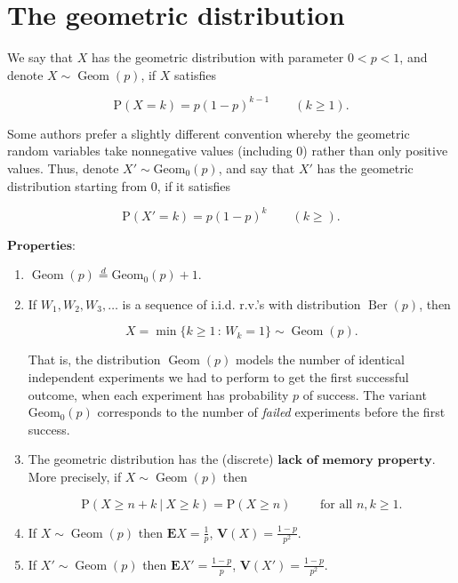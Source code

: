 \documentclass[11pt]{report}
\theoremstyle{plain}
\theoremstyle{definition}
\begin{document}
\section{The geometric distribution}
We say that $X$ has the geometric distribution with
parameter $0<p<1$, and denote
$X\sim \operatorname{Geom}(p)$, if $X$ satisfies

\[
\mathrm{P}(X=k) = p(1-p)^{k-1} \qquad (k \ge 1).
\]

Some authors prefer a slightly different convention
whereby the geometric random variables take
nonnegative values (including $0$) rather than only
positive values. Thus, denote
$X' \sim \operatorname{Geom_0}(p)$, and say that $X'$
has the geometric distribution starting from $0$, if
it satisfies

\[
\mathrm{P}(X'=k) = p(1-p)^{k} \qquad (k \ge ).
\]

$\textbf{Properties:}$

\begin{enumerate}[label=\arabic*.]
\item $\operatorname{Geom}(p) \stackrel{d}{=}
\operatorname{Geom_0}(p) + 1$.

\item If $W_1,W_2,W_3, \ldots$ is a sequence of i.i.d.
r.v.'s with distribution $\operatorname{Ber}(p)$,
then

\[
X = \min\{ k\ge 1\,:\, W_k = 1\}  \sim \operatorname{Geom}(p).
\]

That is, the distribution $\operatorname{Geom}(p)$
models the number of identical independent experiments
we had to perform to get the first successful outcome,
when each experiment has probability $p$ of success.
The variant $\operatorname{Geom_0}(p)$ corresponds to
the number of \emph{failed} experiments before the first
success.

\item The geometric distribution has the (discrete)
$\textbf{lack of memory property}$. More precisely,
if $X \sim \operatorname{Geom}(p)$ then

\[
\mathrm{P}(X \ge n+k \ |\ X \ge k) = \mathrm{P}(X \ge n)\qquad \textrm{ for all $n,k\ge 1$}.
\]

\item If $X\sim \operatorname{Geom}(p)$ then
$\mathbf{E} X = \frac1p$,
$\mathbf{V}(X) = \frac{1-p}{p^2}$.

\item If $X'\sim \operatorname{Geom}(p)$ then
$\mathbf{E} X' = \frac{1-p}{p}$,
$\mathbf{V}(X') = \frac{1-p}{p^2}$.
\end{enumerate}
\end{document}
